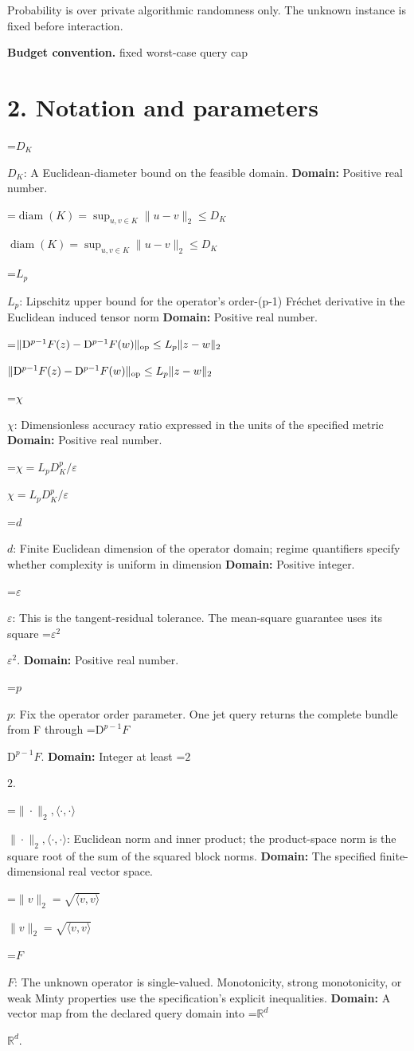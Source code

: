 \documentclass[10pt,a4paper]{article}
\newcommand{\AtlasMath}[1]{\par\begingroup\centering\setbox0=\hbox{$\displaystyle #1$}\ifdim\wd0>1.4\linewidth\typeout{ATLAS WIDE FORMULA: \the\wd0}\fi\ifdim\wd0>\linewidth\resizebox{\linewidth}{!}{\box0}\else\box0\fi\par\endgroup}
\newcommand{\AtlasInlineMath}[1]{\begingroup\setbox0=\hbox{$#1$}\ifdim\wd0>.4\linewidth\endgroup\AtlasMath{#1}\else\endgroup$#1$\fi}
\begin{document}
Probability is over private algorithmic randomness only. The unknown instance is fixed before interaction.

\textbf{Budget convention.} fixed worst-case query cap

\section{2. Notation and parameters}
\AtlasInlineMath{D_K}: A Euclidean-diameter bound on the feasible domain. \textbf{Domain:} Positive real number.

\AtlasInlineMath{\operatorname{diam}(K)=\sup_{u,v\in K}\|u-v\|_2\le D_K}

\AtlasInlineMath{L_p}: Lipschitz upper bound for the operator's order-(p-1) Fréchet derivative in the Euclidean induced tensor norm \textbf{Domain:} Positive real number.

\AtlasInlineMath{\|\mathrm D^{p-1}F(z)-\mathrm D^{p-1}F(w)\|_{\rm op}\le L_p\|z-w\|_2}

\AtlasInlineMath{\chi}: Dimensionless accuracy ratio expressed in the units of the specified metric \textbf{Domain:} Positive real number.

\AtlasInlineMath{\chi=L_pD_K^p/\varepsilon}

\AtlasInlineMath{d}: Finite Euclidean dimension of the operator domain; regime quantifiers specify whether complexity is uniform in dimension \textbf{Domain:} Positive integer.

\AtlasInlineMath{\varepsilon}: This is the tangent-residual tolerance. The mean-square guarantee uses its square \AtlasInlineMath{\varepsilon^2}. \textbf{Domain:} Positive real number.

\AtlasInlineMath{p}: Fix the operator order parameter. One jet query returns the complete bundle from F through \AtlasInlineMath{\mathrm D^{p-1}F}. \textbf{Domain:} Integer at least \AtlasInlineMath{2}.

\AtlasInlineMath{\|\cdot\|_2,\langle\cdot,\cdot\rangle}: Euclidean norm and inner product; the product-space norm is the square root of the sum of the squared block norms. \textbf{Domain:} The specified finite-dimensional real vector space.

\AtlasInlineMath{\|v\|_2=\sqrt{\langle v,v\rangle}}

\AtlasInlineMath{F}: The unknown operator is single-valued. Monotonicity, strong monotonicity, or weak Minty properties use the specification’s explicit inequalities. \textbf{Domain:} A vector map from the declared query domain into \AtlasInlineMath{\mathbb R^d}.
\end{document}
